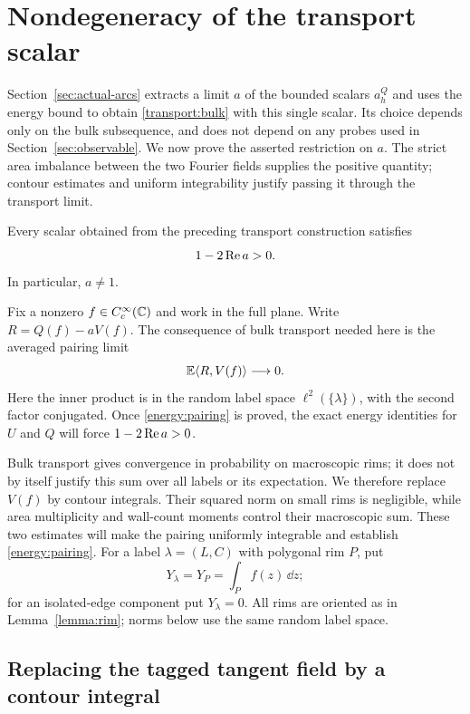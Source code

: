 \section{Nondegeneracy of the transport scalar}
\label{sec:nondegeneracy}

Section~\ref{sec:actual-arcs} extracts a limit $a$ of the bounded scalars
$a_h^Q$ and uses the energy bound to obtain \eqref{transport:bulk} with
this single scalar. Its choice depends only on the bulk subsequence, and
does not depend on any probes used in Section~\ref{sec:observable}. We now
prove the asserted restriction on $a$. The strict area imbalance between
the two Fourier fields supplies the positive quantity; contour estimates
and uniform integrability justify passing it through the transport limit.

\begin{proposition}[Nondegeneracy]
\label{prop:nondegeneracy}
Every scalar obtained from the preceding transport construction satisfies
\[
                 1-2\operatorname{Re} a>0.
\]
In particular, $a\ne1$.
\end{proposition}

Fix a nonzero $f\in C_c^\infty(\mathbb C)$ and work in the full plane.
Write $R=Q(f)-aV(f)$. The consequence of bulk transport needed here is
the averaged pairing limit
\begin{equation}
             \mathbb E\langle R,V(f)\rangle\longrightarrow0.
 \label{energy:pairing}
\end{equation}
Here the inner product is in the random label space
$\ell^2(\{\lambda\})$, with the second factor conjugated. Once
\eqref{energy:pairing} is proved, the exact energy identities for $U$ and
$Q$ will force $1-2\operatorname{Re} a>0$.

Bulk transport gives convergence in probability on macroscopic rims;
it does not by itself justify this sum over all labels or its expectation.
We therefore replace $V(f)$ by contour integrals. Their squared norm on
small rims is negligible, while area multiplicity and wall-count moments
control their macroscopic sum. These two estimates will make the pairing
uniformly integrable and establish \eqref{energy:pairing}.
For a label $\lambda=(L,C)$ with polygonal rim $P$, put
\[
             Y_\lambda=Y_P=\int_P f(z)\,\dd z;
\]
for an isolated-edge component put $Y_\lambda=0$. All rims are oriented as
in Lemma~\ref{lemma:rim}; norms below use the same random label space.

\subsection{Replacing the tagged tangent field by a contour integral}

